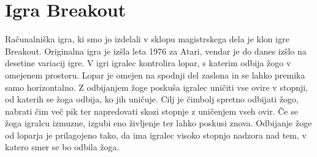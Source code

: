 \documentclass[12pt,a4paper,twoside]{book}
\begin{document}
\section{Igra Breakout}
Računalniška igra, ki smo jo izdelali v sklopu magistrskega dela je klon igre Breakout. Originalna igra je izšla leta 1976 za Atari, vendar je do danes izšlo na desetine variacij igre. V igri igralec kontrolira lopar, s katerim odbija žogo v omejenem prostoru. Lopar je omejen na spodnji del zaslona in se lahko premika samo horizontalno. Z odbijanjem žoge poskuša igralec uničiti vse ovire v stopnji, od katerih se žoga odbija, ko jih uničuje. Cilj je čimbolj spretno odbijati žogo, nabrati čim več pik ter napredovati skozi stopnje z uničenjem vseh ovir. Če se žoga igralcu izmuzne, izgubi eno življenje ter lahko poskusi znova. Odbijanje žoge od loparja je prilagojeno tako, da ima igralec visoko stopnjo nadzora nad tem, v katero smer se bo odbila žoga.
\end{document}

